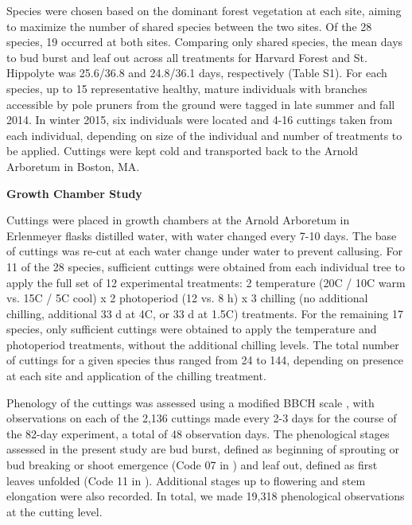 \documentclass[11pt]{article}
\begin{document}
Species were chosen based on the dominant forest vegetation at each site, aiming to maximize the number of shared species between the two sites. Of the 28 species, 19 occurred at both sites. Comparing only shared species, the mean days to bud burst and leaf out across all treatments for Harvard Forest and St. Hippolyte was 25.6/36.8 and 24.8/36.1 days, respectively (Table S1). For each species, up to 15 representative healthy, mature individuals with branches accessible by pole pruners from the ground were tagged in late summer and fall 2014. In winter 2015, six individuals were located and 4-16 cuttings taken from each individual, depending on size of the individual and number of treatments to be applied. Cuttings were kept cold and transported back to the Arnold Arboretum in Boston, MA.

\textbf{Growth Chamber Study}

Cuttings were placed in growth chambers at the Arnold Arboretum in Erlenmeyer flasks distilled water, with water changed every 7-10 days. The base of cuttings was re-cut at each water change under water to prevent callusing. For 11 of the 28 species, sufficient cuttings were obtained from each individual tree to apply the full set of 12 experimental treatments: 2 temperature (20\degree C / 10\degree C warm vs. 15\degree C / 5\degree C cool) x 2 photoperiod (12 vs. 8 h) x 3 chilling (no additional chilling,  additional 33 d at 4\degree C, or 33 d at 1.5\degree C) treatments. For the remaining 17 species, only sufficient cuttings were obtained to apply the temperature and photoperiod treatments, without the additional chilling levels. The total number of cuttings for a given species thus ranged from 24 to 144, depending on presence at each site and application of the chilling treatment.

Phenology of the cuttings was assessed using a modified BBCH scale \cite{Finn:2007}, with observations on each of the 2,136 cuttings made every 2-3 days for the course of the 82-day experiment, a total of 48 observation days. The phenological stages assessed in the present study are bud burst, defined as beginning of sprouting or bud breaking or shoot emergence (Code 07 in \cite{Finn:2007}) and leaf out, defined as first leaves unfolded (Code 11 in \cite{Finn:2007}). Additional stages up to flowering and stem elongation were also recorded. In total, we made 19,318 phenological observations at the cutting level.
\end{document}
